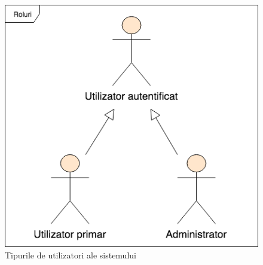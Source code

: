 \documentclass[12pt,a4paper,twoside]{report}
\begin{document}
\begin{figure}[H]
\begin{center}
\advance\leftskip-3cm
\advance\rightskip-3cm
\includegraphics[keepaspectratio=true,scale=0.35]{img/user_roles.png}
\caption{Tipurile de utilizatori ale sistemului}
\label{user_roles}
\end{center}
\end{figure}
\end{document}
